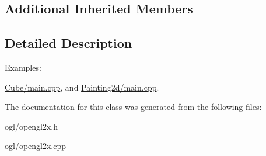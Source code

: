 \subsection*{Additional Inherited Members}


\subsection{Detailed Description}
\begin{Desc}
\item[Examples\+: ]\par
\hyperlink{_cube_2main_8cpp-example}{Cube/main.\+cpp}, and \hyperlink{_painting2d_2main_8cpp-example}{Painting2d/main.\+cpp}.\end{Desc}


The documentation for this class was generated from the following files\+:\begin{DoxyCompactItemize}
\item 
ogl/opengl2x.\+h\item 
ogl/opengl2x.\+cpp\end{DoxyCompactItemize}
